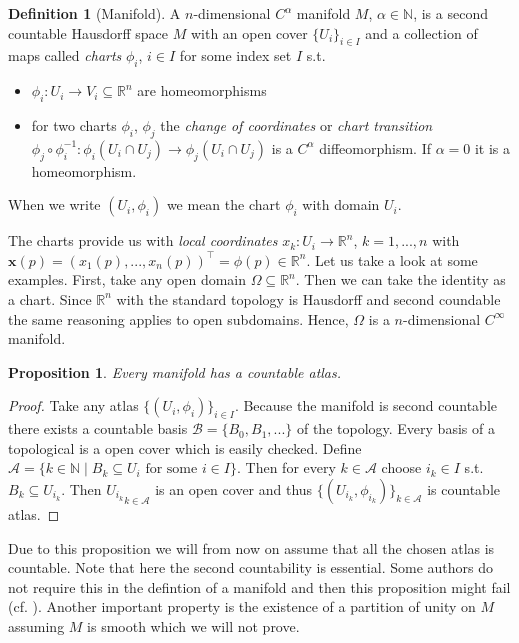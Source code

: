 \documentclass[12pt,a4paper]{article}
\numberwithin{equation}{subsection}
\numberwithin{lemma}{subsection}
\newtheorem{proposition}[lemma]{Proposition}
\theoremstyle{definition}
\newtheorem{definition}[lemma]{Definition}
\newcommand{\naturalnum}{\mathbb{N}}
\newcommand{\real}{\mathbb{R}}
\begin{document}
\begin{definition}[Manifold]
    A $n$-dimensional $C^\alpha$ manifold $M$, $\alpha \in \naturalnum$, 
    is a second countable Hausdorff 
    space $M$ with an open cover $\{ U_i \} _{i\in I}$
    and a collection of maps called \textit{charts} $\phi_i$, $i\in I$ for 
    some index set $I$ s.t.
    \begin{itemize}
        \item $\phi_i: U_i \rightarrow V_i \subseteq \real^{n}$
            are homeomorphisms
        \item for two charts $\phi_i$, $\phi_j$ the 
            \textit{change of coordinates} or 
            \textit{chart transition} $\phi_j \circ \phi_i^{-1}: 
            \phi_i(U_i \cap U_j) \rightarrow \phi_j(U_i \cap U_j)$ 
            is a $C^\alpha$ diffeomorphism. If $\alpha=0$ it is a homeomorphism.
    \end{itemize}
    When we write $(U_i, \phi_i)$ we mean the chart $\phi_i$ with domain $U_i$.
\end{definition}
The charts provide us with \textit{local coordinates} $x_k: U_i \rightarrow \real^n$,
$k = 1, ..., n$ with $\mathbf{x}(p) = (x_1(p),...,x_n(p))^\top = \phi(p) \in \real^n$.
Let us take a look at some examples. First, take any open domain 
$\Omega \subseteq \real^n$. Then we can take the identity as a chart.
Since $\real^n$ with the standard topology is Hausdorff and second coundable
the same reasoning applies to open subdomains. Hence, $\Omega$ is a 
$n$-dimensional $C^\infty$ manifold. 

\begin{proposition}
    Every manifold has a countable atlas. 
\end{proposition}
\begin{proof}
    Take any atlas $\{(U_i, \phi_i) \}_{i \in I}$. Because the manifold is 
    second countable there exists a countable basis
    $\mathcal{B} = \{ B_0, B_1, ... \}$ of the topology. Every basis of a topological is 
    a open cover which is easily checked. Define 
    $\mathcal{A} = \{ k \in \naturalnum \mid B_k \subseteq U_i \text{ for some 
    $i \in I$} \}$. Then for every $k \in \mathcal{A}$ choose 
    $i_k \in I$ s.t. $B_k \subseteq U_{i_k}$. Then ${U_{i_k}}_{k\in \mathcal{A}}$ 
    is an open cover and thus $\{ (U_{i_k}, \phi_{i_k}) \}_{k \in \mathcal{A}}$
    is countable atlas.
\end{proof}
Due to this proposition we will from now on assume that all the chosen atlas
is countable.
Note that here the second countability is essential. Some authors do not 
require this in the defintion of a manifold and then this proposition might fail 
(cf. \cite[1.A.2]{gallot_hulin_lafontaine}).
Another important property is the existence of a partition of unity on $M$ 
assuming $M$ is smooth which we will not prove.
\end{document}
